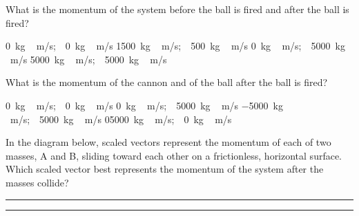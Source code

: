 \documentclass[answers,dvipsnames]{exam}
\begin{document}
\begin{questions}
\question
What is the momentum of the system before the ball is fired and after the ball is fired?

\begin{randomizechoices}[norandomize]
    \correctchoice \SI{0}{kg\,m/s};\ \  \SI{0}{kg\,m/s}
    \choice \SI{1500}{kg\,m/s};\ \  \SI{500}{kg\,m/s}
    \choice \SI{0}{kg\,m/s};\ \  \SI{5000}{kg\,m/s}
    \choice \SI{5000}{kg\,m/s};\ \  \SI{5000}{kg\,m/s}
\end{randomizechoices}

\question 
What is the momentum of the cannon and of the ball after the ball is fired?

\begin{randomizechoices}[norandomize]
    \choice \SI{0}{kg\,m/s};\ \  \SI{0}{kg\,m/s}
    \choice \SI{0}{kg\,m/s};\ \  \SI{5000}{kg\,m/s}
    \correctchoice \SI{-5000}{kg\,m/s};\ \  \SI{5000}{kg\,m/s}
    \choice \SI{05000}{kg\,m/s};\ \  \SI{0}{kg\,m/s}
\end{randomizechoices}


\question
In the diagram below, scaled vectors represent the momentum of each of two masses, A and B, sliding toward each other on a frictionless, horizontal surface. Which scaled vector best represents the momentum of the system after the masses collide?

\begin{center}
\end{center}

\begin{randomizeoneparchoices}[norandomize]
    \choice {}
    \correctchoice {}
    \choice {}
    \choice {}
\end{randomizeoneparchoices}

\bigskip

\hrule
\hrule



\clearpage
\printkeytable

\end{questions}
\end{document}
